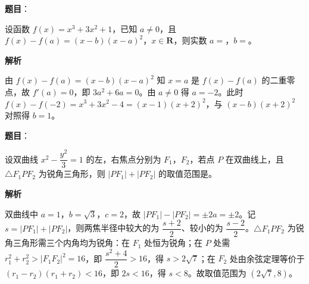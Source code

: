 \begin{answer}

\textbf{题目}：

设函数 \(f(x)=x^{3}+3x^{2}+1\)，已知 \(a\neq0\)，且 \(f(x)-f(a)=(x-b)(x-a)^{2}\)，\(x\in\mathbf{R}\)，则实数 \(a=\)\gkblank{}，\(b=\)\gkblank{}。

\textbf{解析}

由 \(f(x)-f(a)=(x-b)(x-a)^{2}\) 知 \(x=a\) 是 \(f(x)-f(a)\) 的二重零点，故 \(f'(a)=0\)，即 \(3a^{2}+6a=0\)。由 \(a\neq0\) 得 \(a=-2\)。此时 \(f(x)-f(-2)=x^{3}+3x^{2}-4=(x-1)(x+2)^{2}\)，与 \((x-b)(x+2)^{2}\) 对照得 \(b=1\)。


\end{answer}
\begin{answer}

\textbf{题目}：

设双曲线 \(x^{2}-\dfrac{y^{2}}{3}=1\) 的左，右焦点分别为 \(F_{1}\)，\(F_{2}\)，若点 \(P\) 在双曲线上，且 \(\triangle F_{1}PF_{2}\) 为锐角三角形，则 \(|PF_{1}|+|PF_{2}|\) 的取值范围是\gkblank{}。

\textbf{解析}

双曲线中 \(a=1\)，\(b=\sqrt{3}\)，\(c=2\)，故 \(|PF_{1}|-|PF_{2}|=\pm2a=\pm2\)。记 \(s=|PF_{1}|+|PF_{2}|\)，则两焦半径中较大的为 \(\dfrac{s+2}{2}\)、较小的为 \(\dfrac{s-2}{2}\)。\(\triangle F_{1}PF_{2}\) 为锐角三角形需三个内角均为锐角：在 \(F_{1}\) 处恒为锐角；在 \(P\) 处需 \(r_{1}^{2}+r_{2}^{2}>|F_{1}F_{2}|^{2}=16\)，即 \(\dfrac{s^{2}+4}{2}>16\)，得 \(s>2\sqrt{7}\)；在 \(F_{2}\) 处由余弦定理等价于 \((r_{1}-r_{2})(r_{1}+r_{2})<16\)，即 \(2s<16\)，得 \(s<8\)。故取值范围为 \((2\sqrt{7},8)\)。


\end{answer}
